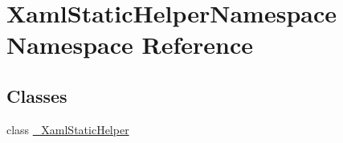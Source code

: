 \hypertarget{namespace_xaml_static_helper_namespace}{}\section{Xaml\+Static\+Helper\+Namespace Namespace Reference}
\label{namespace_xaml_static_helper_namespace}
\subsection*{Classes}
\begin{DoxyCompactItemize}
\item 
class \hyperlink{class_xaml_static_helper_namespace_1_1___xaml_static_helper}{\+\_\+\+Xaml\+Static\+Helper}
\end{DoxyCompactItemize}
